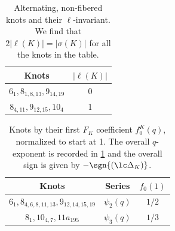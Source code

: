 \documentclass[11pt,e-only]{amsart}
\begin{document}




\begin{table}[h!]
    \centering
    \begin{tabular}{|c|c|}
        \hline
        Knots & $|\ell(K)|$ \\
        \hline
        $6_1,8_{1,8,13},9_{14,19}$ & 0 \\
        $8_{4,11},9_{12,15},10_4$ & 1 \\
        \hline
    \end{tabular}
    \caption{Alternating, non-fibered knots and their $\ell$-invariant. We find that $2|\ell(K)|=|\sigma(K)|$ for all the knots in the table.}
    \label{tab:L-invariant}
\end{table}

\begin{table}[h!]
    \centering
    \begin{tabular}{|c|c|c|}
        \hline
        Knots & Series & $f_0(1)$ \\
        \hline
        $6_1, 8_{4,6,8,11,13},9_{12,14,15,19}$ & $\psi_2(q)$ & $1/2$ \\
        $8_1,10_{4,7},11a_{195}$ & $\psi_3(q)$ & $1/3$ \\
        \hline
    \end{tabular}
    \caption{Knots by their first $F_K$ coefficient $f_0^K(q)$, normalized to start at 1. The overall $q$-exponent is recorded in \cref{tab:L-invariant} and the overall sign is given by $-\sgn{\left(\lc \Delta_K\right)}$.}
    \label{tab:first-FK}
\end{table}

\end{document}
